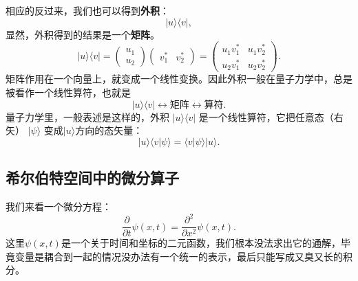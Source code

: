 \documentclass[UTF8]{ctexbook}
\begin{document}
相应的反过来，我们也可以得到\textbf{外积}：
\[
|u\rangle\langle v|,
\]
显然，外积得到的结果是一个\textbf{矩阵}。
\[
|u\rangle\langle v|
=
\begin{pmatrix}
u_1\\
u_2
\end{pmatrix}
\begin{pmatrix}
v_1^* & v_2^*
\end{pmatrix}
=
\begin{pmatrix}
u_1v_1^* & u_1v_2^*\\
u_2v_1^* & u_2v_2^*
\end{pmatrix}.
\]
矩阵作用在一个向量上，就变成一个线性变换。因此外积一般在量子力学中，总是被看作一个线性算符，也就是
\[
|u\rangle\langle v| \longleftrightarrow \text{矩阵} \longleftrightarrow \text{算符}.
\]
量子力学里，一般表述是这样的，外积 \(|u\rangle\langle v|\) 是一个线性算符，它把任意态（右矢） \(|\psi\rangle\) 变成$|u\rangle$方向的态矢量：
\[
|u\rangle\langle v|\psi\rangle
=
\langle v|\psi\rangle |u\rangle.
\]


\subsection{希尔伯特空间中的微分算子}

我们来看一个微分方程：
\[
\frac{\partial}{\partial t}\psi(x,t)
=
\frac{\partial^2}{\partial x^2}
\psi(x,t).
\]
这里$\psi(x,t)$是一个关于时间和坐标的二元函数，我们根本没法求出它的通解，毕竟变量是耦合到一起的情况没办法有一个统一的表示，最后只能写成又臭又长的积分。
\end{document}
